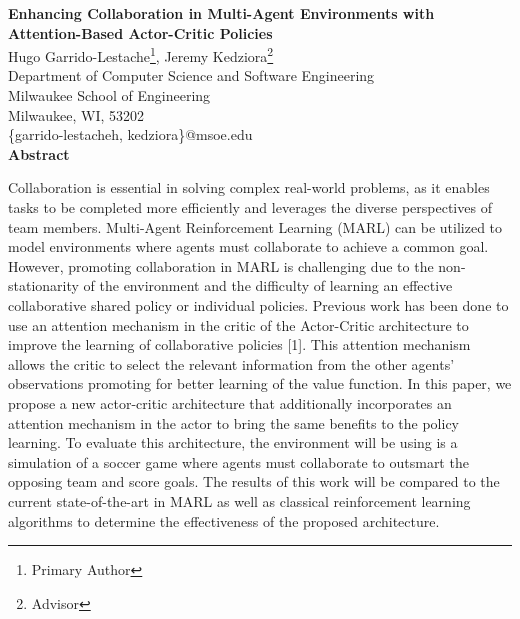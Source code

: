 \documentclass[12pt]{article}
\begin{document}
\thispagestyle{empty} 

\begin{center}
    \vspace*{1.5in}
    {\fontsize{18}{22}\selectfont \textbf{Enhancing Collaboration in Multi-Agent Environments with Attention-Based Actor-Critic Policies}}\\[2\baselineskip]

    {\fontsize{14}{17}\selectfont Hugo Garrido-Lestache\footnote{Primary Author}, Jeremy Kedziora\footnote{Advisor}}\\
    {\fontsize{14}{17}\selectfont Department of Computer Science and Software Engineering}\\
    {\fontsize{14}{17}\selectfont Milwaukee School of Engineering}\\
    {\fontsize{14}{17}\selectfont Milwaukee, WI, 53202}\\
    {\fontsize{14}{17}\selectfont \{garrido-lestacheh, kedziora\}@msoe.edu}\\[2\baselineskip]

    {\bfseries \fontsize{16}{19}\selectfont Abstract}\\[1\baselineskip]

    \parbox{0.85\textwidth}{
        \fontsize{12}{14}\selectfont
        Collaboration is essential in solving complex real-world problems,
        as it enables tasks to be completed more efficiently and leverages the diverse perspectives of team members.
        Multi-Agent Reinforcement Learning (MARL) can be utilized to model environments where agents must collaborate to achieve a common goal.
        However, promoting collaboration in MARL is challenging due to the non-stationarity of the environment and the difficulty of learning an effective collaborative shared policy or individual policies.
        Previous work has been done to use an attention mechanism in the critic of the Actor-Critic architecture to improve the learning of collaborative policies [1].
        This attention mechanism allows the critic to select the relevant information from the other agents' observations promoting for better learning of the value function.
        In this paper, we propose a new actor-critic architecture that additionally incorporates an attention mechanism in the actor to bring the same benefits to the policy learning.
        To evaluate this architecture, the environment will be using is a simulation of a soccer game where agents must collaborate to outsmart the opposing team and score goals.
        The results of this work will be compared to the current state-of-the-art in MARL as well as classical reinforcement learning algorithms to determine the effectiveness of the proposed architecture.
    }
\end{center}
\end{document}
